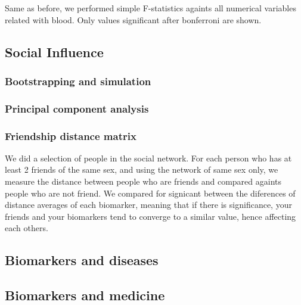\documentclass[10pt, a4paper, onecolumn]{article} %
\begin{document}
Same as before, we performed simple F-statistics againts all numerical variables related with blood. Only values significant after bonferroni are shown.\\

	

	

\subsection{Social Influence}

\subsubsection{Bootstrapping and simulation}

\subsubsection{Principal component analysis}

\subsubsection{Friendship distance matrix}

We did a selection of people in the social network. For each person who has at least 2 friends of the same sex, and using the network of same sex only, we measure the distance between people who are friends and compared againts people who are not friend. We compared for signicant between the diferences of distance averages of each biomarker, meaning that if there is significance, your friends and your biomarkers tend to converge to a similar value, hence affecting each others.\\



\subsection{Biomarkers and diseases}

\subsection{Biomarkers and medicine}




\end{document}
